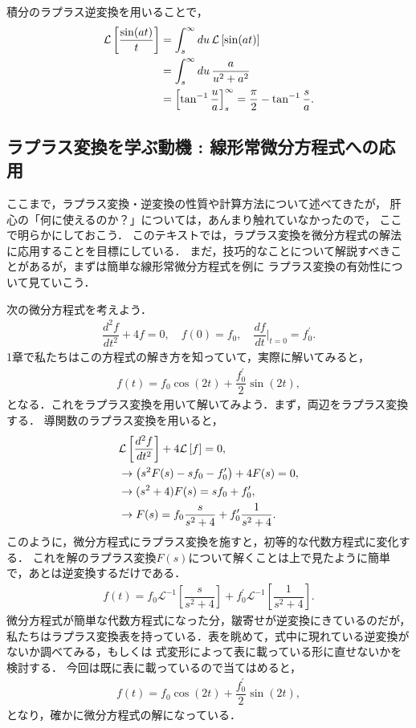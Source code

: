 積分のラプラス逆変換を用いることで，
\begin{align}
  \mathcal{L}\left[\dfrac{\sin(at)}{t}\right] 
  &= \int_{s}^{\infty}du\, \mathcal{L}\left[\sin(at)\right] \notag \\
  &= \int_{s}^{\infty}du\, \dfrac{a}{u^2 + a^2} \notag \\
  &= \left[\tan^{-1}\dfrac{u}{a}\right]_{s}^{\infty} = \dfrac{\pi}{2} - \tan^{-1}\dfrac{s}{a}. 
\end{align}

\subsection{ラプラス変換を学ぶ動機 : 線形常微分方程式への応用}
%
ここまで，ラプラス変換・逆変換の性質や計算方法について述べてきたが，
肝心の「何に使えるのか？」については，あんまり触れていなかったので，
ここで明らかにしておこう．
このテキストでは，ラプラス変換を微分方程式の解法に応用することを目標にしている．
まだ，技巧的なことについて解説すべきことがあるが，まずは簡単な線形常微分方程式を例に
ラプラス変換の有効性について見ていこう．

次の微分方程式を考えよう．
\begin{align}
 \dfrac{d^2f}{dt^2} + 4f = 0, \quad f(0)=f_0, \quad \dfrac{df}{dt}\biggr|_{t=0} = f^{\prime}_0. 
\end{align}
1章で私たちはこの方程式の解き方を知っていて，実際に解いてみると，
\begin{align}
  f(t) = f_0 \cos(2t) + \dfrac{f_0^{\prime}}{2}\sin(2t), 
\end{align}
となる．これをラプラス変換を用いて解いてみよう．まず，両辺をラプラス変換する．
導関数のラプラス変換を用いると，
\begin{align}
  &\mathcal{L}\left[\dfrac{d^2 f}{dt^2}\right] + 4 \mathcal{L}\left[f\right] = 0, \notag \\
  &\rightarrow \left(s^2 F(s)-sf_0-f_0^{\prime}\right) + 4F(s) = 0, \notag \\
  &\rightarrow (s^2+4)F(s) = sf_0 + f_0^{\prime}, \notag \\
  &\rightarrow F(s) = f_0 \dfrac{s}{s^2+4} + f_0^{\prime}\dfrac{1}{s^2+4}. 
\end{align}
このように，微分方程式にラプラス変換を施すと，初等的な代数方程式に変化する．
これを解のラプラス変換$F(s)$について解くことは上で見たように簡単で，あとは逆変換するだけである．
\begin{align}
 f(t) = f_0 \mathcal{L}^{-1}\left[\dfrac{s}{s^2+4}\right] + f_0^{\prime}\mathcal{L}^{-1}\left[\dfrac{1}{s^2+4} \right].
\end{align}
微分方程式が簡単な代数方程式になった分，皺寄せが逆変換にきているのだが，
私たちはラプラス変換表を持っている．表を眺めて，式中に現れている逆変換がないか調べてみる，もしくは
式変形によって表に載っている形に直せないかを検討する．
今回は既に表に載っているので当てはめると，
\begin{align}
 f(t) = f_0 \cos(2t) + \dfrac{f_0^\prime}{2}\sin(2t), 
\end{align}
となり，確かに微分方程式の解になっている．

